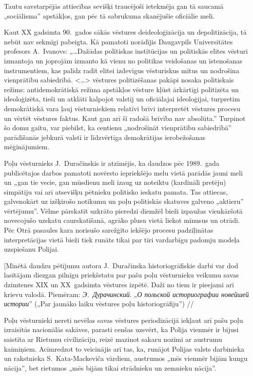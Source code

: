 \documentclass[twoside,a5paper,12pt,fleqn,openany]{extbook}
\newcommand{\rutxti}[1]{\textit{\textrussian{#1}}}
\newcommand{\citespace}{<\dots{}>}
\begin{document}
Tautu savstarpējās attiecības sevišķi traucējoši ietekmēja gan tā saucamā „sociālisma” apstākļos, gan pēc tā sabrukuma skanējušie oficiālie meli.

Kaut XX gadsimta 90.~gados sākās vēstures deideoloģizācija un depolitizācija, tā nebūt nav sekmīgi pabeigta. Kā pamatoti norādījis Daugavpils Universitātes profesors A.~Ivanovs: „\dots{}Dažādas politiskas institūcijas un politiskās elites vēsturi izmantoja un joprojām izmanto kā vienu no politikas veidošanas un īstenošanas instrumentiem, kas palīdz radīt elitei izdevīgus vēsturiskus mītus un nodrošina vienprātību sabiedrībā. \citespace{} vēstures politizēšanas pakāpi nosaka politiskais režīms: antidemokrātiskā režīma apstākļos vēsture kļūst ārkārtīgi politizēta un ideoloģizēta, tieši un atklāti kalpojot valstij un oficiālajai ideoloģijai, turpretim demokrātiskā vara ļauj vēsturniekiem relatīvi brīvi interpretēt vēstures procesu un vērtēt vēstures faktus. Kaut gan arī šī radošā brīvība nav absolūta.” Turpinot šo domu gaitu, var piebilst, ka centienu „nodrošināt vienprātību sabiedrībā” parādīšanās jebkurā valstī ir līdzvērtīga demokrātijas ierobežošanas mēģinājumiem.

Poļu vēsturnieks J.~Duračinskis ir atzīmējis, ka daudzos pēc 1989.~gada publicētajos darbos pamatoti novērsto iepriekšējo melu vietā parādās jauni meli un „gan tie vecie, gan mūsdienu meli izaug uz noteiktu (kardināli pretēju) simpātiju vai arī atsevišķu pētnieku politisko ieskatu pamata. Tas attiecas, galvenokārt uz izšķirošo notikumu un poļu politiskās skatuves galveno „aktieru” vērtējumu”. Vēlme pārskatīt uzkrāto pieredzi diemžēl bieži izpaužas vienkāršotā novecojušo uzskatu caurskatīšanā, agrāko plusu vietā liekot mīnusus un otrādi. Pēc Otrā pasaules kara norisušo sarežģīto iekšējo procesu padziļinātas interpretācijas vietā bieži tiek runāts tikai par tīri vardarbīgu padomju modeļa uzspiešanu Polijai.

[Minētā daudzu pētījumu autora J.~Duračinska historiogrāfiskie darbi var dod lasītājam diezgan pilnīgu priekšstatu par pašu poļu vēsturnieku veikumu savas dzimtenes XIX un XX~gadsimta vēstures izpētē. Daži no tiem ir pieejami arī krievu valodā. Piemēram: \rutxti{Э.~Дурачинский}. „\rutxti{О польской историографии новейшей истории}” („Par jaunāko laiku vēstures poļu historiogrāfiju”) // %

Poļu vēsturnieki nereti nevēlas savas vēstures periodizācijā iekļaut arī pašu poļu izraisītās nacionālās sakāves, parasti cenšas uzsvērt, ka Polija vienmēr ir bijusi saistīta ar Rietumu civilizāciju, reizē mazinot sakaru nozīmi ar austrumu kaimiņiem. Acīmredzot to veicinājis arī tas, ka, runājot Polijas valsts darbinieka un rakstnieka S.~Kata-Mackeviča vārdiem, austrumos „mēs vienmēr bijām kungu nācija”, bet rietumos „mēs bijām tikai strādnieku un zemnieku nācija”.
\end{document}
